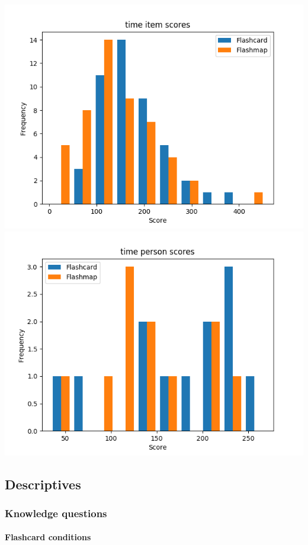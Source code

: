 \documentclass[]{article}
\begin{document}
\includegraphics{time_diff.png} \includegraphics{time_abil.png}

\subsection{Descriptives}\label{descriptives-1}

\subsubsection{Knowledge questions}\label{knowledge-questions}

\FloatBarrier
\paragraph{Flashcard conditions}\label{flashcard-conditions-3}
\end{document}
